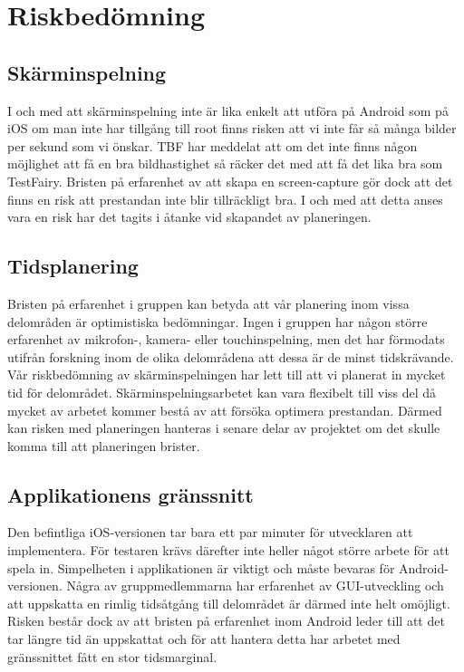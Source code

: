 \section{Riskbedömning}

\subsection{Skärminspelning}
I och med att skärminspelning inte är lika enkelt att utföra på Android som på iOS om man inte har tillgång till root finns risken att vi inte får så många bilder per sekund som vi önskar. TBF har meddelat att om det inte finns någon möjlighet att få en bra bildhastighet så räcker det med att få det lika bra som TestFairy. Bristen på erfarenhet av att skapa en screen-capture gör dock att det finns en risk att prestandan inte blir tillräckligt bra. I och med att detta anses vara en risk har det tagits i åtanke vid skapandet av planeringen.

\subsection{Tidsplanering}
Bristen på erfarenhet i gruppen kan betyda att vår planering inom vissa delområden är optimistiska bedömningar. Ingen i gruppen har någon större erfarenhet av mikrofon-, kamera- eller touchinspelning, men det har förmodats utifrån forskning inom de olika delområdena att dessa är de minst tidskrävande. Vår riskbedömning av skärminspelningen har lett till att vi planerat in mycket tid för delområdet. Skärminspelningsarbetet kan vara flexibelt till viss del då mycket av arbetet kommer bestå av att försöka optimera prestandan. Därmed kan risken med planeringen hanteras i senare delar av projektet om det skulle komma till att planeringen brister.

\subsection{Applikationens gränssnitt}
Den befintliga iOS-versionen tar bara ett par minuter för utvecklaren att implementera. För testaren krävs därefter inte heller något större arbete för att spela in. Simpelheten i applikationen är viktigt och måste bevaras för Android-versionen. Några av gruppmedlemmarna har erfarenhet av GUI-utveckling och att uppskatta en rimlig tidsåtgång till delområdet är därmed inte helt omöjligt. Risken består dock av att bristen på erfarenhet inom Android leder till att det tar längre tid än uppskattat och för att hantera detta har arbetet med gränssnittet fått en stor tidsmarginal.